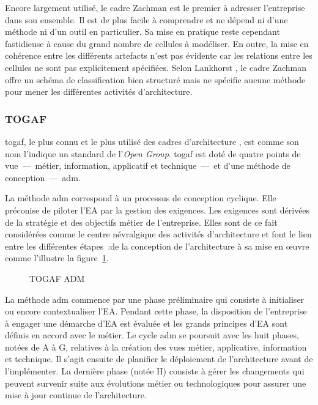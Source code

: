 Encore largement utilisé, le cadre Zachman est le premier à adresser
l'entreprise dans son ensemble. Il est de plus facile à comprendre et ne dépend
ni d'une méthode ni d'un outil en particulier. Sa mise en pratique reste
cependant fastidieuse à cause du grand nombre de cellules à modéliser. En
outre, la mise en cohérence entre les différents artefacts n'est pas évidente
car les relations entre les cellules ne sont pas explicitement spécifiées.
Selon Lankhorst \cite{lankhorst2013enterprise}, le cadre Zachman offre un
schéma de classification bien structuré mais ne spécifie aucune méthode pour
mener les différentes activités d'architecture.

\subsubsection{TOGAF} 

\gls{togaf}, le plus connu et le plus utilisé des cadres d'architecture \cite{winter2008enterprise}, est comme son nom l'indique un standard de l'\textit{Open Group}. \gls{togaf} est doté de quatre points de vue~—~métier, information, applicatif et technique~—~et d'une méthode de conception~—~\gls{adm}. 

La méthode \gls{adm} correspond à un processus de conception cyclique. Elle préconise
de piloter l'EA par la gestion des exigences. Les exigences sont dérivées de la
stratégie et des objectifs métier de l'entreprise. Elles sont de ce fait
considérées comme le centre névralgique des activités d'architecture et font le
lien entre les différentes étapes~:de la conception de l'architecture à sa mise
en œuvre comme l'illustre la figure~\ref{fig:TOGAF}. 

\begin{figure}[!ht]
    \begin{center}
        
    \end{center}
    \caption{TOGAF ADM \protect\cite{togaf2009}}
    \label{fig:TOGAF}
\end{figure}

La méthode \gls{adm} commence par une phase préliminaire qui consiste à initialiser
ou encore contextualiser l'EA. Pendant cette phase, la disposition de
l'entreprise à engager une démarche d'EA est évaluée et les grands principes
d'EA sont définis en accord avec le métier. Le cycle \gls{adm} se poursuit avec les
huit phases, notées de A à G, relatives à la création des vues métier,
applicative, information et technique. Il s'agit ensuite de planifier le
déploiement de l'architecture avant de l'implémenter. La dernière phase (notée H)
consiste à gérer les changements qui peuvent survenir suite aux évolutions
métier ou technologiques pour assurer une mise à jour continue de
l'architecture. 


